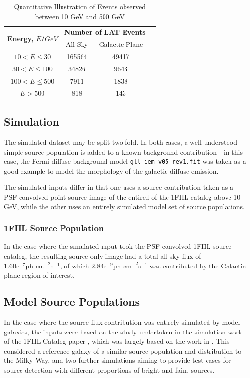 \documentclass{PoS}
\begin{document}
\begin{table}
\centering
\begin{tabular}{|c|c|c|c|}
\hline
\multirow{2}{*}{\textbf{Energy, $E$/$GeV$}} & \multicolumn{2}{|c|}{\textbf{Number of LAT Events}}\\
 & All Sky & Galactic Plane \\\hline
$10 < E \leq 30$ & 165564 & 49417 \\\hline
$30 < E \leq 100$ & 34826 & 9643 \\\hline
$100 < E \leq 500$ & 7911 & 1838 \\\hline
$ E > 500$ & 818 & 143 \\\hline
\end{tabular}
\caption{Quantitative Illustration of Events observed between 10 GeV and 500 GeV}
\end{table}

\subsection{Simulation}

The simulated dataset may be split two-fold. In both cases, a well-understood simple source population is added to a known background contribution - in this case, the Fermi diffuse background model \verb|gll_iem_v05_rev1.fit| was taken as a good example to model the morphology of the galactic diffuse emission.

The simulated inputs differ in that one uses a source contribution taken as a PSF-convolved point source image of the entired of the 1FHL catalog above 10 GeV, while the other uses an entirely simulated model set of source populations.

\subsubsection{1FHL Source Population}

In the case where the simulated input took the PSF convolved 1FHL source catalog, the resulting source-only image had a total all-sky flux of $1.60\text{e}^{-7} \text{ph cm}^{-2}\text{s}^{-1}$, of which $2.84\text{e}^{-9} \text{ph cm}^{-2}\text{s}^{-1}$ was contributed by the Galactic plane region of interest.

\subsection{Model Source Populations}

In the case where the source flux contribution was entirely simulated by model galaxies, the inputs were based on the study undertaken in the simulation work of the 1FHL Catalog paper \cite[p.59]{1fhl}, which was largely based on the work in \cite{Strong}. This considered a reference galaxy of a similar source population and distribution to the Milky Way, and two further simulations aiming to provide test cases for source detection with different proportions of bright and faint sources.
\end{document}
